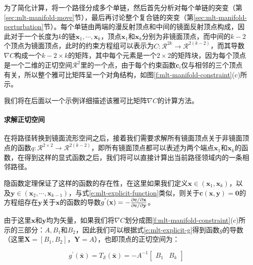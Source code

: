 为了简化计算，\cite{a:ManifoldExplorationAMarkovChainMonteCarloTechniqueforRenderingSceneswithDifficultSpecularTransport}将一个路径分成多个单链，然后首先分析对每个单链的突变（第\ref{sec:mlt-manifold-move}节），最后再讨论整个复合链的突变（第\ref{sec:mlt-manifold-perturbation}节）。每个单链由两端的漫反射顶点和中间的镜面反射顶点构成，因此对于一个长度为$k$的链$\mathbf{x}_1,\cdots,\mathbf{x}_k$，顶点$\mathbf{x}_1$和$\mathbf{x}_k$分别为非镜面顶点，而中间的$k-2$个顶点为镜面顶点，此时的约束方程组可以表示为$C:\mathcal{R}^{2k}\to\mathcal{R}^{2(k-2)}$，而其导数$\nabla C$构成一个$k-2\times k$的矩阵，其中每个元素是一个$2\times 2$的矩阵块，因为每个顶点是一个二维的正切空间$\mathcal{R}^{2}$里的一个点，由于每个约束函数$\mathbf{c}_i$仅与相邻的三个顶点有关，所以整个雅可比矩阵呈一个对角结构，如图\ref{f:mlt-manifold-constraint}(c)所示。

我们将在后面以一个示例详细描述该雅可比矩阵$\nabla C$的计算方法。




\paragraph{求解正切空间}
在将路径转换到镜面流形空间之后，接着我们需要求解所有镜面顶点关于非镜面顶点的函数$q:\mathcal{R}^{2\times 2}\to\mathcal{R}^{2(k-2)}$，即所有镜面顶点都可以表述为两个端点$\mathbf{x}_1$和$\mathbf{x}_k$的函数，在得到这样的显式函数之后，我们将可以直接计算出当前路径领域内的一条相邻路径。

隐函数定理保证了这样的函数的存在性，在这里如果我们定义$\mathbf{x}\in (\mathbf{x}_1,\mathbf{x}_k)$，以及$\mathbf{y}\in (\mathbf{x}_2,\cdots,\mathbf{x}_{k-1})$，与式\ref{e:mlt-explicit-function}类似，则关于$\mathbf{c}(\mathbf{x},\mathbf{y})=\mathbf{0}$的方程组存在$\mathbf{y}$关于$\mathbf{x}$的函数的导数$g^{'}(\mathbf{x})=-\frac{{\rm \partial} \mathbf{c}/{\rm \partial} \mathbf{x}}{{\rm \partial} \mathbf{c}/{\rm \partial} \mathbf{y}}$。

由于这里$\mathbf{x}$和$\mathbf{y}$均为矢量，如果我们将$\nabla C$划分成图\ref{f:mlt-manifold-constraint}(c)所示的三部分：$A,B_1$和$B_2$，因此我们可以根据式\ref{e:mlt-explicit-g}得到函数$g$的导数（这里$\mathbf{X}=[B_1,B_2]$，$\mathbf{Y}=A$），也即顶点的正切空间为：

\begin{equation}
	g^{'}(\bar{\mathbf{x}})=T_{\mathcal{S}}(\bar{\mathbf{x}})=-A^{-1}\begin{bmatrix}
		B_1 &B_k
	\end{bmatrix}
\end{equation}


